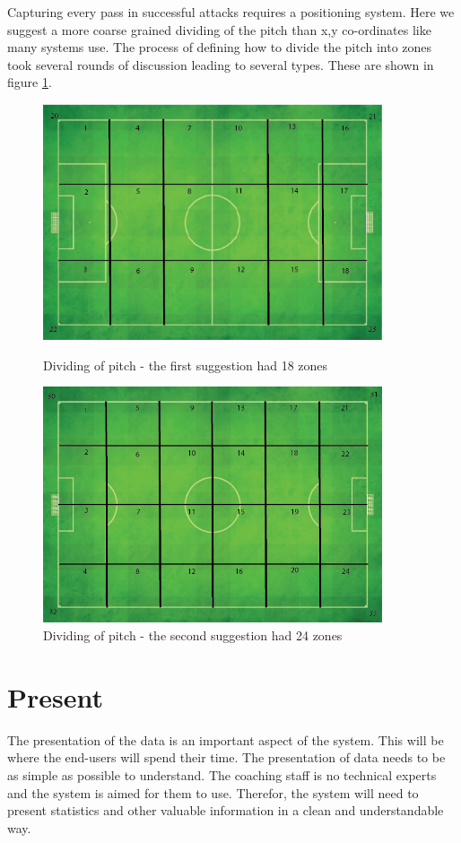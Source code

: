 Capturing every pass in successful attacks requires a positioning system. Here we suggest a more coarse grained dividing of the pitch than x,y co-ordinates like many systems use. The process of defining how to divide the pitch into zones took several rounds of discussion leading to several types. These are shown in figure \ref{fig:zones}.

\begin{figure}[ht!]
\centering
\includegraphics[width=100mm]{images/general/first_zones.png}
\caption{Dividing of pitch - the first suggestion had 18 zones}
\includegraphics[width=100mm]{images/general/second_zones.png}
\caption{Dividing of pitch - the second suggestion had 24 zones}
\label{fig:zones}
\end{figure}


\section{Present}

The presentation of the data is an important aspect of the system. This will be where the end-users will spend their time. The presentation of data needs to be as simple as possible to understand. The coaching staff is no technical experts and the system is aimed for them to use. Therefor, the system will need to present statistics and other valuable information in a clean and understandable way. 


